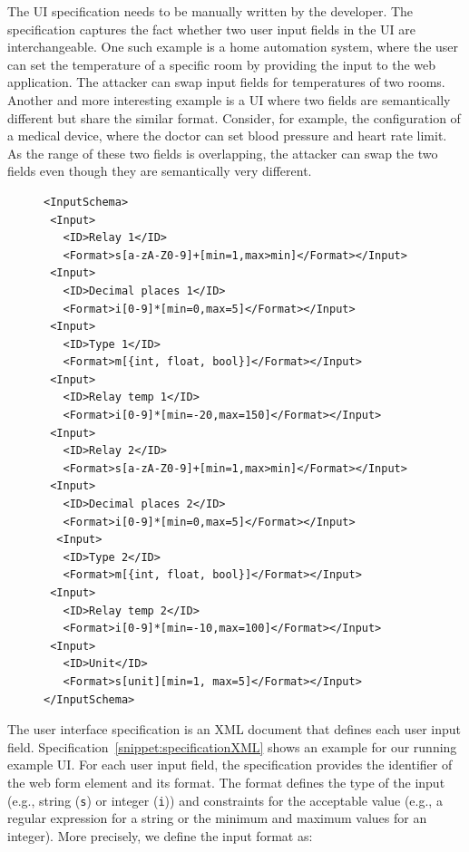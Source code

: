 The UI specification needs to be manually written by the developer. The specification captures the fact whether two user input fields in the UI are interchangeable. One such example is a home automation system, where the user can set the temperature of a specific room by providing the input to the web application. The attacker can swap input fields for temperatures of two rooms. Another and more interesting example is a UI where two fields are semantically different but share the similar format. Consider, for example, the configuration of a medical device, where the doctor can set blood pressure and heart rate limit. As the range of these two fields is overlapping, the attacker can swap the two fields even though they are semantically very different.

\begin{figure}[t]
\begin{lstlisting}[mathescape=true]
<InputSchema>
 <Input>
   <ID>Relay 1</ID>
   <Format>s[a-zA-Z0-9]+[min=1,max>min]</Format></Input>
 <Input>
   <ID>Decimal places 1</ID>
   <Format>i[0-9]*[min=0,max=5]</Format></Input>
 <Input>
   <ID>Type 1</ID>
   <Format>m[{int, float, bool}]</Format></Input>
 <Input>
   <ID>Relay temp 1</ID>
   <Format>i[0-9]*[min=-20,max=150]</Format></Input>
 <Input>
   <ID>Relay 2</ID>
   <Format>s[a-zA-Z0-9]+[min=1,max>min]</Format></Input>
 <Input>
   <ID>Decimal places 2</ID>
   <Format>i[0-9]*[min=0,max=5]</Format></Input>
  <Input>
   <ID>Type 2</ID>
   <Format>m[{int, float, bool}]</Format></Input>
 <Input>
   <ID>Relay temp 2</ID>
   <Format>i[0-9]*[min=-10,max=100]</Format></Input>
 <Input>
   <ID>Unit</ID>
   <Format>s[unit][min=1, max=5]</Format></Input>
</InputSchema>
\end{lstlisting} 
\end{figure}

The user interface specification is an XML document that defines each user input field. Specification~\ref{snippet:specificationXML} shows an example for our running example UI. For each user input field, the specification provides the identifier of the web form element and its format. The format defines the type of the input (e.g., string (\texttt{s}) or integer (\texttt{i})) and constraints for the acceptable value (e.g., a regular expression for a string or the minimum and maximum values for an integer).
More precisely, we define the input format as:%

